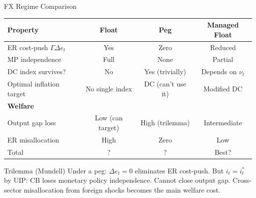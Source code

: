 \documentclass[aspectratio=169]{beamer}
\begin{document}
\begin{frame}{FX Regime Comparison}

\begin{center}
\begin{tabular}{lccc}
\toprule
\textbf{Property} & \textbf{Float} & \textbf{Peg} & \textbf{Managed Float} \\
\midrule
ER cost-push $\Gamma\Delta e_t$ & Yes & Zero & Reduced \\
MP independence & Full & None & Partial \\
DC index survives? & No & Yes (trivially) & Depends on $\nu_t$ \\
Optimal inflation target & No single index & DC (can't use it) & Modified DC \\
\midrule
\textbf{Welfare} & & & \\
\quad Output gap loss & Low (can target) & High (trilemma) & Intermediate \\
\quad ER misallocation & High & Zero & Low \\
\quad Total & ? & ? & Best? \\
\bottomrule
\end{tabular}
\end{center}

\vspace{0.2cm}
\begin{block}{Trilemma (Mundell)}
Under a peg: $\Delta e_t = 0$ eliminates ER cost-push. But $i_t = i_t^*$ by UIP: CB loses monetary policy independence. Cannot close output gap. Cross-sector misallocation from foreign shocks becomes the main welfare cost.
\end{block}
\end{frame}
\end{document}
